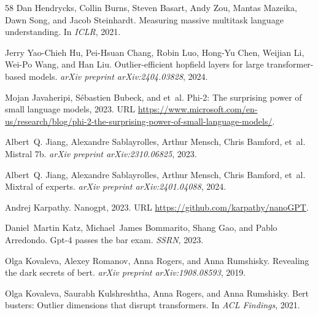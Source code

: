 \documentclass[10pt]{article}
\theoremstyle{definition}
\theoremstyle{plain}
\begin{document}
\begin{thebibliography}{58}
Dan Hendrycks, Collin Burns, Steven Basart, Andy Zou, Mantas Mazeika, Dawn Song, and Jacob Steinhardt.
\newblock Measuring massive multitask language understanding.
\newblock In \emph{ICLR}, 2021.

Jerry Yao-Chieh Hu, Pei-Hsuan Chang, Robin Luo, Hong-Yu Chen, Weijian Li, Wei-Po Wang, and Han Liu.
\newblock Outlier-efficient hopfield layers for large transformer-based models.
\newblock \emph{arXiv preprint arXiv:2404.03828}, 2024.

Mojan Javaheripi, Sébastien Bubeck, and et~al.
\newblock Phi-2: The surprising power of small language models, 2023.
\newblock URL \url{https://www.microsoft.com/en-us/research/blog/phi-2-the-surprising-power-of-small-language-models/}.

Albert~Q. Jiang, Alexandre Sablayrolles, Arthur Mensch, Chris Bamford, et~al.
\newblock Mistral 7b.
\newblock \emph{arXiv preprint arXiv:2310.06825}, 2023.

Albert~Q. Jiang, Alexandre Sablayrolles, Arthur Mensch, Chris Bamford, et~al.
\newblock Mixtral of experts.
\newblock \emph{arXiv preprint arXiv:2401.04088}, 2024.

Andrej Karpathy.
\newblock Nanogpt, 2023.
\newblock URL \url{https://github.com/karpathy/nanoGPT}.

Daniel~Martin Katz, Michael~James Bommarito, Shang Gao, and Pablo Arredondo.
\newblock Gpt-4 passes the bar exam.
\newblock \emph{SSRN}, 2023.

Olga Kovaleva, Alexey Romanov, Anna Rogers, and Anna Rumshisky.
\newblock Revealing the dark secrets of bert.
\newblock \emph{arXiv preprint arXiv:1908.08593}, 2019.

Olga Kovaleva, Saurabh Kulshreshtha, Anna Rogers, and Anna Rumshisky.
\newblock Bert busters: Outlier dimensions that disrupt transformers.
\newblock In \emph{ACL Findings}, 2021.


\end{thebibliography}
\end{document}
